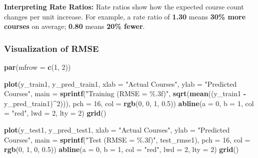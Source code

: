\documentclass[
]{article}
\newenvironment{Shaded}{\begin{snugshade}}{\end{snugshade}}
\newcommand{\AttributeTok}[1]{\textcolor[rgb]{0.13,0.29,0.53}{#1}}
\newcommand{\DecValTok}[1]{\textcolor[rgb]{0.00,0.00,0.81}{#1}}
\newcommand{\FloatTok}[1]{\textcolor[rgb]{0.00,0.00,0.81}{#1}}
\newcommand{\FunctionTok}[1]{\textcolor[rgb]{0.13,0.29,0.53}{\textbf{#1}}}
\newcommand{\NormalTok}[1]{#1}
\newcommand{\SpecialCharTok}[1]{\textcolor[rgb]{0.81,0.36,0.00}{\textbf{#1}}}
\newcommand{\StringTok}[1]{\textcolor[rgb]{0.31,0.60,0.02}{#1}}
\begin{document}
\textbf{Interpreting Rate Ratios:} Rate ratios show how the expected
course count changes per unit increase. For example, a rate ratio of
\textbf{1.30} means \textbf{30\% more courses} on average; \textbf{0.80}
means \textbf{20\% fewer}.

\subsubsection{Visualization of RMSE}\label{visualization-of-rmse}

\begin{Shaded}
\begin{Highlighting}[]
\FunctionTok{par}\NormalTok{(}\AttributeTok{mfrow =} \FunctionTok{c}\NormalTok{(}\DecValTok{1}\NormalTok{, }\DecValTok{2}\NormalTok{))}

\FunctionTok{plot}\NormalTok{(y\_train1, y\_pred\_train1,}
     \AttributeTok{xlab =} \StringTok{"Actual Courses"}\NormalTok{, }\AttributeTok{ylab =} \StringTok{"Predicted Courses"}\NormalTok{,}
     \AttributeTok{main =} \FunctionTok{sprintf}\NormalTok{(}\StringTok{"Training (RMSE = \%.3f)"}\NormalTok{,}
                    \FunctionTok{sqrt}\NormalTok{(}\FunctionTok{mean}\NormalTok{((y\_train1 }\SpecialCharTok{{-}}\NormalTok{ y\_pred\_train1)}\SpecialCharTok{\^{}}\DecValTok{2}\NormalTok{))),}
     \AttributeTok{pch =} \DecValTok{16}\NormalTok{, }\AttributeTok{col =} \FunctionTok{rgb}\NormalTok{(}\DecValTok{0}\NormalTok{, }\DecValTok{0}\NormalTok{, }\DecValTok{1}\NormalTok{, }\FloatTok{0.5}\NormalTok{))}
\FunctionTok{abline}\NormalTok{(}\AttributeTok{a =} \DecValTok{0}\NormalTok{, }\AttributeTok{b =} \DecValTok{1}\NormalTok{, }\AttributeTok{col =} \StringTok{"red"}\NormalTok{, }\AttributeTok{lwd =} \DecValTok{2}\NormalTok{, }\AttributeTok{lty =} \DecValTok{2}\NormalTok{)}
\FunctionTok{grid}\NormalTok{()}

\FunctionTok{plot}\NormalTok{(y\_test1, y\_pred\_test1,}
     \AttributeTok{xlab =} \StringTok{"Actual Courses"}\NormalTok{, }\AttributeTok{ylab =} \StringTok{"Predicted Courses"}\NormalTok{,}
     \AttributeTok{main =} \FunctionTok{sprintf}\NormalTok{(}\StringTok{"Test (RMSE = \%.3f)"}\NormalTok{, test\_rmse1),}
     \AttributeTok{pch =} \DecValTok{16}\NormalTok{, }\AttributeTok{col =} \FunctionTok{rgb}\NormalTok{(}\DecValTok{0}\NormalTok{, }\DecValTok{1}\NormalTok{, }\DecValTok{0}\NormalTok{, }\FloatTok{0.5}\NormalTok{))}
\FunctionTok{abline}\NormalTok{(}\AttributeTok{a =} \DecValTok{0}\NormalTok{, }\AttributeTok{b =} \DecValTok{1}\NormalTok{, }\AttributeTok{col =} \StringTok{"red"}\NormalTok{, }\AttributeTok{lwd =} \DecValTok{2}\NormalTok{, }\AttributeTok{lty =} \DecValTok{2}\NormalTok{)}
\FunctionTok{grid}\NormalTok{()}
\end{Highlighting}
\end{Shaded}
\end{document}
